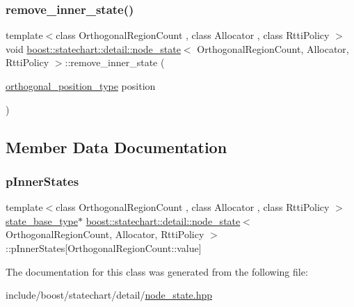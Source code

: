 \subsubsection{\texorpdfstring{remove\+\_\+inner\+\_\+state()}{remove\_inner\_state()}}
{\footnotesize\ttfamily template$<$class Orthogonal\+Region\+Count , class Allocator , class Rtti\+Policy $>$ \\
void \mbox{\hyperlink{classboost_1_1statechart_1_1detail_1_1node__state}{boost\+::statechart\+::detail\+::node\+\_\+state}}$<$ Orthogonal\+Region\+Count, Allocator, Rtti\+Policy $>$\+::remove\+\_\+inner\+\_\+state (\begin{DoxyParamCaption}\item[{\mbox{\hyperlink{namespaceboost_1_1statechart_1_1detail_a3bedea0b807a16fa222733417183d2c9}{orthogonal\+\_\+position\+\_\+type}}}]{position }\end{DoxyParamCaption})\hspace{0.3cm}{\ttfamily [inline]}}



\subsection{Member Data Documentation}
\mbox{\label{classboost_1_1statechart_1_1detail_1_1node__state_a5846a2cfb93ebd33d1de2c3beec1f29f}} 
\subsubsection{\texorpdfstring{p\+Inner\+States}{pInnerStates}}
{\footnotesize\ttfamily template$<$class Orthogonal\+Region\+Count , class Allocator , class Rtti\+Policy $>$ \\
\mbox{\hyperlink{classboost_1_1statechart_1_1detail_1_1node__state__base_a2b7ddb7642a5452045d9448444426735}{state\+\_\+base\+\_\+type}}$\ast$ \mbox{\hyperlink{classboost_1_1statechart_1_1detail_1_1node__state}{boost\+::statechart\+::detail\+::node\+\_\+state}}$<$ Orthogonal\+Region\+Count, Allocator, Rtti\+Policy $>$\+::p\+Inner\+States\mbox{[}Orthogonal\+Region\+Count\+::value\mbox{]}\hspace{0.3cm}{\ttfamily [private]}}



The documentation for this class was generated from the following file\+:\begin{DoxyCompactItemize}
\item 
include/boost/statechart/detail/\mbox{\hyperlink{node__state_8hpp}{node\+\_\+state.\+hpp}}\end{DoxyCompactItemize}
